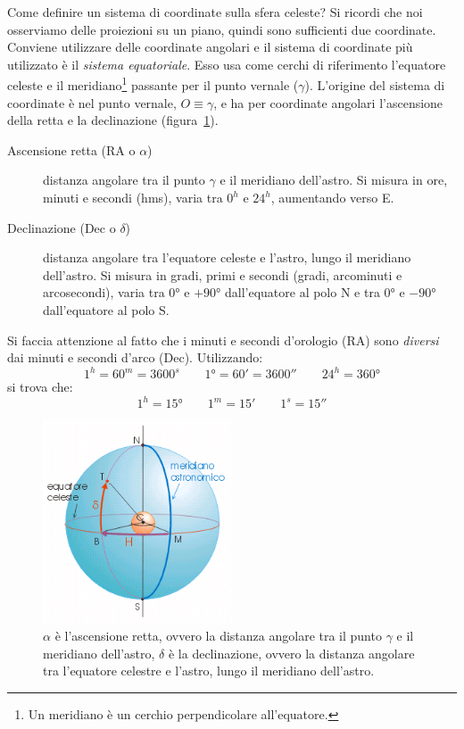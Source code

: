 Come definire un sistema di coordinate sulla sfera celeste? Si ricordi che noi osserviamo delle proiezioni su un piano, quindi sono sufficienti due coordinate. Conviene utilizzare delle coordinate angolari e il sistema di coordinate più utilizzato è il \emph{sistema equatoriale}. Esso usa come cerchi di riferimento l'equatore celeste e il meridiano\footnote{Un meridiano è un cerchio perpendicolare all'equatore.} passante per il punto vernale ($\gamma$). L'origine del sistema di coordinate è nel punto vernale, $O \equiv \gamma$, e ha per coordinate angolari l'ascensione della retta e la declinazione (figura~\ref{fig:sistema-equatoriale}).
\begin{description}
    \item[Ascensione retta (RA o $\alpha$)] distanza angolare tra il punto $\gamma$ e il meridiano dell'astro. Si misura in ore, minuti e secondi (hms), varia tra $0^h$ e $24^h$, aumentando verso E.
    \item[Declinazione (Dec o $\delta$)] distanza angolare tra l'equatore celeste e l'astro, lungo il meridiano dell'astro. Si misura in gradi, primi e secondi (gradi, arcominuti e arcosecondi), varia tra $\ang{0}$ e $+\ang{90}$ dall'equatore al polo N e tra $\ang{0}$ e $-\ang{90}$ dall'equatore al polo S.
\end{description}
Si faccia attenzione al fatto che i minuti e secondi d'orologio (RA) sono \emph{diversi} dai minuti e secondi d'arco (Dec). Utilizzando:
\[
    1^h = 60^m = 3600^s \qquad \ang{1} = 60' = 3600'' \qquad 24^h = \ang{360}
\]
si trova che:
\[
    1^h = \ang{15} \qquad 1^m = 15' \qquad 1^s = 15''
\]

\begin{figure}
\centering
\includegraphics[width=0.5\textwidth]{immagini/sistema-equatoriale.png}
\caption{$\alpha$ è l'ascensione retta, ovvero la distanza angolare tra il punto $\gamma$ e il meridiano dell'astro, $\delta$ è la declinazione, ovvero la distanza angolare tra l'equatore celestre e l'astro, lungo il meridiano dell'astro.}
\label{fig:sistema-equatoriale}
\end{figure}


